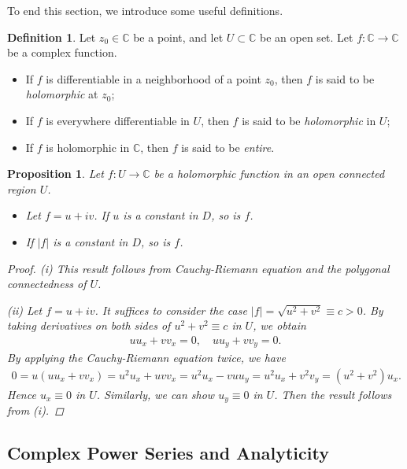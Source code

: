 \documentclass{article}
\numberwithin{equation}{section}
\newcommand{\bbC}{\mathbb{C}}
\theoremstyle{plain}
\newtheorem{proposition}[theorem]{Proposition}
\theoremstyle{definition}
\newtheorem{definition}[theorem]{Definition}
\begin{document}
To end this section, we introduce some useful definitions.
\begin{definition}
Let $z_0\in\bbC$ be a point, and let $U\subset\bbC$ be an open set. Let $f:\bbC\to\bbC$ be a complex function.
\begin{itemize}
\item[(i)] If $f$ is differentiable in a neighborhood of a point $z_0$, then $f$ is said to be \textit{holomorphic} at $z_0$;
\item[(ii)] If $f$ is everywhere differentiable in $U$, then $f$ is said to be \textit{holomorphic} in $U$;
\item[(iii)] If $f$ is holomorphic in $\bbC$, then $f$ is said to be \textit{entire}.
\end{itemize}
\end{definition}

\begin{proposition}
Let $f:U\to\bbC$ be a holomorphic function in an open connected region $U$. 
\begin{itemize}
	\item[(i)] Let $f=u+iv$. If $u$ is a constant in $D$, so is $f$.
	\item[(ii)] If $\vert f\vert$ is a constant in $D$, so is $f$.
\end{itemize}
\begin{proof}
(i) This result follows from Cauchy-Riemann equation and the polygonal connectedness of $U$.

(ii) Let $f=u+iv$. It suffices to consider the case $\vert f\vert=\sqrt{u^2+v^2}\equiv c>0$. By taking derivatives on both sides of $u^2+v^2\equiv c$ in $U$, we obtain
\begin{align*}
	uu_x+vv_x=0,\quad uu_y+vv_y=0.
\end{align*}
By applying the Cauchy-Riemann equation twice, we have
\begin{align*}
	0=u(uu_x+vv_x)=u^2u_x+uvv_x=u^2u_x-vuu_y=u^2u_x+v^2v_y=(u^2+v^2)u_x.
\end{align*}
Hence $u_x\equiv 0$ in $U$. Similarly, we can show $u_y\equiv 0$ in $U$. Then the result follows from (i).
\end{proof}
\end{proposition}

\subsection{Complex Power Series and Analyticity}
\end{document}
